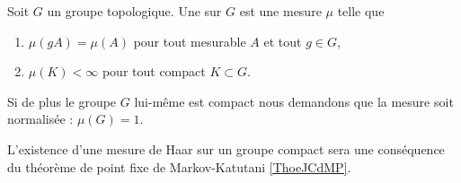 \begin{definition}
    Soit \( G\) un groupe topologique. Une  sur \( G\) est une mesure \( \mu\) telle que 
    \begin{enumerate}
        \item
            \( \mu(gA)=\mu(A)\) pour tout mesurable \( A\) et tout \( g\in G\),
        \item
            \( \mu(K)<\infty\) pour tout compact \( K\subset G\).
    \end{enumerate}
    Si de plus le groupe \( G\) lui-même est compact nous demandons que la mesure soit normalisée : \( \mu(G)=1\).
\end{definition}
L'existence d'une mesure de Haar sur un groupe compact sera une conséquence du théorème de point fixe de Markov-Katutani \ref{ThoeJCdMP}.

